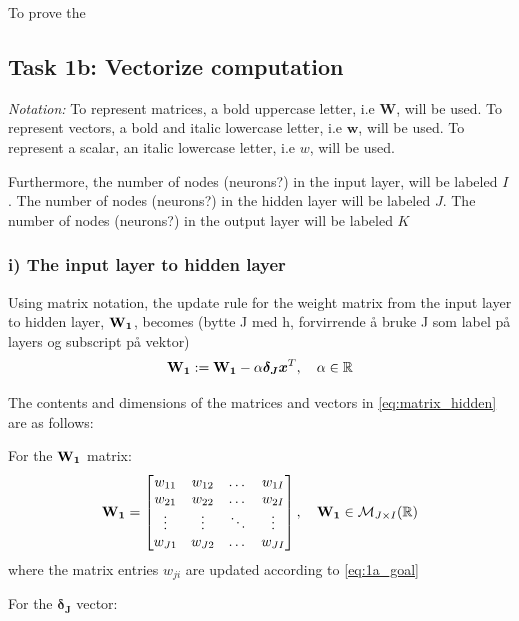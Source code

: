 \documentclass{article}
\begin{document}
To prove the 
\subsection{Task 1b: Vectorize computation}
\textit{Notation:} To represent matrices, a bold uppercase letter, i.e \textbf{W}, will be used. To represent vectors, a bold and italic lowercase letter, i.e $\boldsymbol{w}$, will be used. To represent a scalar, an italic lowercase letter, i.e $w$, will be used. 

Furthermore, the number of nodes (neurons?) in the input layer, will be labeled $I$. The number of nodes (neurons?) in the hidden layer will be labeled $J$. The number of nodes (neurons?) in the output layer will be labeled $K$


\subsubsection*{i) The input layer to hidden layer} 
Using matrix notation, the update rule for the weight matrix from the input layer to hidden layer, $\text{\textbf{W}}_\textbf{1}$, becomes (bytte J med h, forvirrende å bruke J som label på layers og subscript på vektor)
\begin{equation}
    \text{\textbf{W}}_\textbf{1} := \text{\textbf{W}}_\textbf{1} - \alpha \boldsymbol{\delta_J} \boldsymbol{x}^T, \quad \alpha \in \mathbb{R}
    \label{eq:matrix_hidden}
\end{equation}

The contents and dimensions of the matrices and vectors in \eqref{eq:matrix_hidden} are as follows: 

For the $\text{\textbf{W}}_\textbf{1}$ matrix:
\begin{equation}
    \text{\textbf{W}}_\textbf{1} =
    \begin{bmatrix}
        w_{11} & w_{12}& \dots & w_{1I} \\
         w_{21} & w_{22}& \dots & w_{2I} \\
        \vdots & \vdots & \ddots & \vdots \\
         w_{J1} & w_{J2}& \dots & w_{JI} \\
    \end{bmatrix}
    , \quad \text{\textbf{W}}_\textbf{1} \in \mathcal{M}_{J \times I}(\mathbb{R})
\end{equation}
where the matrix entries $w_{ji}$ are updated according to \eqref{eq:1a_goal}

For the $\boldsymbol{\delta_J}$ vector:
\end{document}
